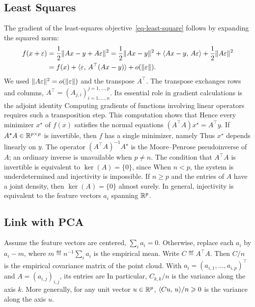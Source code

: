 \subsection{Least Squares}

The gradient of the least-squares objective~\eqref{eq-least-square} follows by expanding the squared norm:
\begin{align*}
	f(x+\varepsilon) &= \frac{1}{2}\lVert Ax-y+A\varepsilon\rVert^2 = \frac12\lVert Ax-y\rVert^2+\langle Ax-y,\,A\varepsilon\rangle + \frac{1}{2}\lVert A\varepsilon\rVert^2 \\
		&=f(x) + \langle \varepsilon,\,A^\top(Ax-y)\rangle + o(\lVert\varepsilon\rVert).
\end{align*} 
We used $\lVert A\varepsilon\rVert^2 = o(\lVert\varepsilon\rVert)$ and the transpose $A^\top$.
%
The transpose exchanges rows and columns, $A^\top = (A_{j,i})_{i=1,\ldots,n}^{j=1,\ldots,p}$. Its essential role in gradient calculations is the adjoint identity
Computing gradients of functions involving linear operators requires such a transposition step.
%
This computation shows that
Hence every minimizer $x^\star$ of $f(x)$ satisfies the normal equations $(A^\top A) x^\star = A^\top y$.
%
If $A^\star A \in \mathbb{R}^{p \times p}$ is invertible, then $f$ has a single minimizer, namely  
Thus $x^\star$ depends linearly on $y$. The operator $(A^\top A)^{-1} A^\star$ is the Moore--Penrose pseudoinverse of $A$; an ordinary inverse is unavailable when $p \neq n$.
%
The condition that $A^\top A$ is invertible is equivalent to $\ker(A)=\{0\}$, since 
When $n<p$, the system is underdetermined and injectivity is impossible. If $n\geq p$ and the entries of $A$ have a joint density, then $\ker(A)=\{0\}$ almost surely. In general, injectivity is equivalent to the feature vectors $a_i$ spanning $\mathbb{R}^p$.
 
\subsection{Link with PCA}

Assume the feature vectors are centered, $\sum_i a_i=0$. Otherwise, replace each $a_i$ by $a_i-m$, where $m\eqdef n^{-1}\sum_i a_i$ is the empirical mean. Write $C\eqdef A^\top A$. Then $C/n$ is the empirical covariance matrix of the point cloud. With $a_i=(a_{i,1},\ldots,a_{i,p})^\top$ and $A=(a_{i,j})_{i,j}$, its entries are
 In particular, $C_{k,k}/n$ is the variance along the axis $k$. More generally, for any unit vector $u \in \mathbb{R}^p$, $\langle C u,\,u\rangle/n \geqslant 0$ is the variance along the axis $u$.
 
